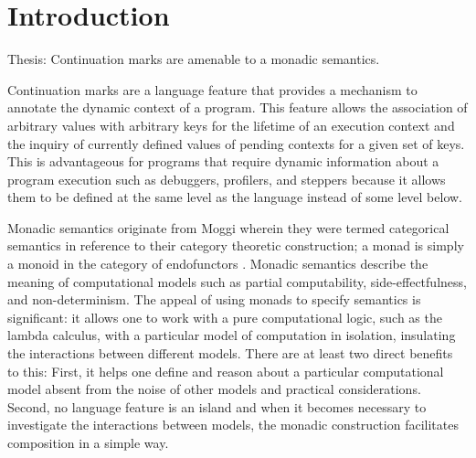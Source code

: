 \documentclass[ms]{byuprop}
\title{\Title}
\author{\Author}
\newcounter{example}
\begin{document}
\maketitle



\section{Introduction}


Thesis: Continuation marks are amenable to a monadic semantics.


Continuation marks \cite{clements2006portable} are a language feature that provides a
mechanism to annotate the dynamic context of a program. This feature allows the
association of arbitrary values with arbitrary keys for the lifetime of an execution
context and the inquiry of currently defined values of pending contexts for a given set of
keys. This is advantageous for programs that require dynamic information about a program
execution such as debuggers, profilers, and steppers because it allows them to be defined
at the same level as the language instead of some level below.



Monadic semantics originate from Moggi \cite{moggi1989computational} wherein they were
termed categorical semantics in reference to their category theoretic construction; a
monad is simply a monoid in the category of endofunctors \cite{mac1998categories}. Monadic semantics describe the
meaning of computational models such as partial computability, side-effectfulness, and
non-determinism. The appeal of using monads to specify semantics is significant: it allows
one to work with a pure computational logic, such as the lambda calculus, with a
particular model of computation in isolation, insulating the interactions between
different models. There are at least two direct benefits to this: First, it helps one
define and reason about a particular computational model absent from the noise of other
models and practical considerations. Second, no language feature is an island and when it
becomes necessary to investigate the interactions between models, the monadic construction
facilitates composition in a simple way.
\end{document}
